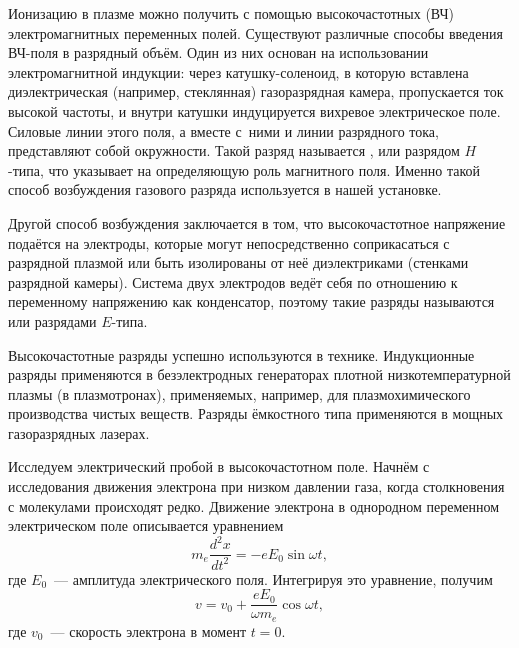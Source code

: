 


Ионизацию в плазме можно получить с помощью высокочастотных (ВЧ)
электромагнитных переменных полей. Существуют различные способы введения ВЧ-поля
в разрядный объём. Один из них основан на использовании электромагнитной
индукции: через катушку-соленоид, в которую вставлена диэлектрическая
(например, стеклянная) газоразрядная камера, пропускается ток высокой частоты,
и внутри катушки индуцируется вихревое электрическое поле.
Силовые линии этого поля, а вместе с~ними и линии разрядного тока,
представляют собой окружности. Такой разряд называется ,
 или разрядом $H$-типа, что указывает
на определяющую роль магнитного поля. Именно такой способ возбуждения газового
разряда используется в нашей установке.

Другой способ возбуждения заключается в том, что высокочастотное напряжение
подаётся на электроды, которые могут непосредственно соприкасаться с разрядной
плазмой или быть изолированы от неё диэлектриками (стенками разрядной камеры).
Система двух электродов ведёт себя по отношению к переменному напряжению как
конденсатор, поэтому такие разряды называются  или
разрядами $E$-типа.

Высокочастотные разряды успешно используются в технике. Индукционные разряды
применяются в безэлектродных генераторах плотной низкотемпературной плазмы
(в плазмотронах), применяемых, например, для плазмохимического производства
чистых
веществ. Разряды ёмкостного типа применяются в мощных газоразрядных лазерах.

Исследуем электрический пробой в высокочастотном поле. Начнём с исследования
движения электрона при низком давлении газа, когда столкновения с молекулами
происходят редко. Движение электрона в однородном переменном электрическом поле
описывается уравнением
\begin{equation*}
    m_e\frac{d^2x}{dt^2}=-eE_0\sin\omega t,
\end{equation*}
где $E_0$~--- амплитуда электрического поля. Интегрируя это уравнение, получим
\begin{equation*}
    v=v_0+\frac{eE_0}{\omega m_e}\cos\omega t,
\end{equation*}
где $v_0$~--- скорость электрона в момент $t=0$.

